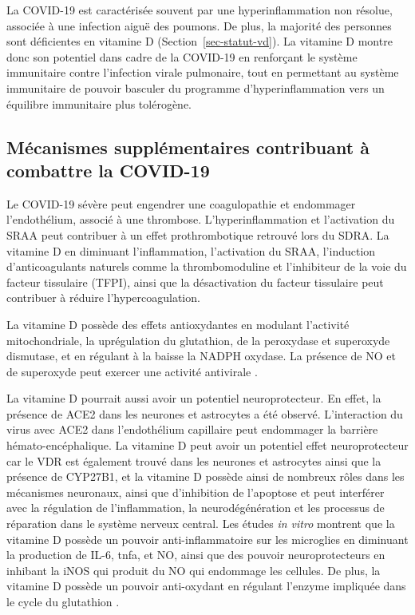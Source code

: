\documentclass[
  a4paper,
  DIV=11,
  numbers=noendperiod,
  listof=totoc]{scrreprt}
\begin{document}
La \ac{COVID-19} est caractérisée souvent par une hyperinflammation non
résolue, associée à une infection aiguë des poumons. De plus, la
majorité des personnes sont déficientes en vitamine D
(Section~\ref{sec-statut-vd}). La vitamine D montre donc son potentiel
dans cadre de la \ac{COVID-19} en renforçant le système immunitaire
contre l'infection virale pulmonaire, tout en permettant au système
immunitaire de pouvoir basculer du programme d'hyperinflammation vers un
équilibre immunitaire plus tolérogène.

\subsection{Mécanismes supplémentaires contribuant à combattre la
COVID-19}\label{muxe9canismes-suppluxe9mentaires-contribuant-uxe0-combattre-la-covid-19}

Le COVID-19 sévère peut engendrer une coagulopathie et endommager
l'endothélium, associé à une thrombose. L'hyperinflammation et
l'activation du \ac{SRAA} peut contribuer à un effet prothrombotique
retrouvé lors du \ac{SDRA}. La vitamine D en diminuant l'inflammation,
l'activation du \ac{SRAA}, l'induction d'anticoagulants naturels comme
la thrombomoduline et l'inhibiteur de la voie du facteur tissulaire
(TFPI), ainsi que la désactivation du facteur tissulaire peut contribuer
à réduire l'hypercoagulation.

La vitamine D possède des effets antioxydantes en modulant l'activité
mitochondriale, la uprégulation du glutathion, de la peroxydase et
superoxyde dismutase, et en régulant à la baisse la NADPH oxydase. La
présence de NO et de superoxyde peut exercer une activité antivirale
\autocite{Shiravi.2022,Contreras-Bolívar.2023}.

La vitamine D pourrait aussi avoir un potentiel neuroprotecteur. En
effet, la présence de \ac{ACE2} dans les neurones et astrocytes a été
observé. L'interaction du virus avec \ac{ACE2} dans l'endothélium
capillaire peut endommager la barrière hémato-encéphalique. La vitamine
D peut avoir un potentiel effet neuroprotecteur car le \ac{VDR} est
également trouvé dans les neurones et astrocytes ainsi que la présence
de \ac{CYP27B1}, et la vitamine D possède ainsi de nombreux rôles dans
les mécanismes neuronaux, ainsi que d'inhibition de l'apoptose et peut
interférer avec la régulation de l'inflammation, la neurodégénération et
les processus de réparation dans le système nerveux central. Les études
\emph{in vitro} montrent que la vitamine D possède un pouvoir
anti-inflammatoire sur les microglies en diminuant la production de
IL-6, \ac{tnfa}, et NO, ainsi que des pouvoir neuroprotecteurs en
inhibant la iNOS qui produit du NO qui endommage les cellules. De plus,
la vitamine D possède un pouvoir anti-oxydant en régulant l'enzyme
impliquée dans le cycle du glutathion \autocite{Shiravi.2022}.
\end{document}
